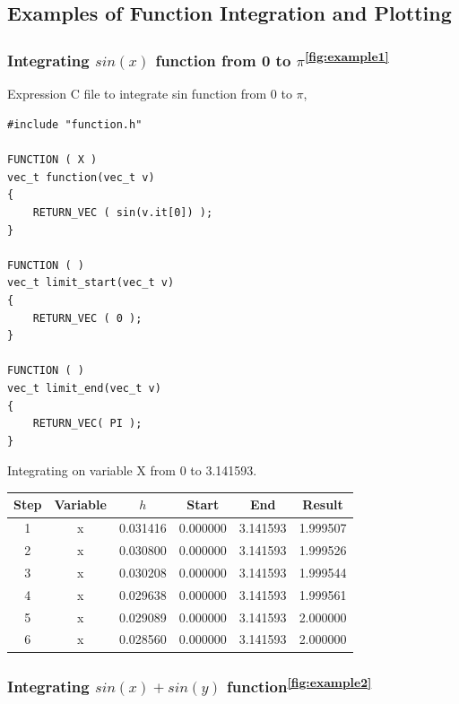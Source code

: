 \documentclass[12pt]{article}
\begin{document}
\pagebreak
\subsection{Examples of Function Integration and Plotting}

\subsubsection{Integrating $sin(x)$ function from 0 to $\pi$\textsuperscript{\ref{fig:example1}}}

\begin{flushleft}
Expression C file to integrate sin function from 0 to $\pi$,
\end{flushleft}

\begin{lstlisting}
#include "function.h"

FUNCTION ( X )
vec_t function(vec_t v)
{
	RETURN_VEC ( sin(v.it[0]) );
}

FUNCTION ( )
vec_t limit_start(vec_t v)
{
	RETURN_VEC ( 0 );
}

FUNCTION ( )
vec_t limit_end(vec_t v)
{
	RETURN_VEC( PI );
}
\end{lstlisting}

\begin{flushleft}
Integrating on variable X from 0 to 3.141593.
\end{flushleft}

\begin{center}
	\begin{tabular}{ |c c c c c c| }
		\hline
		\hline
		Step & Variable & $h$ & Start & End & Result \\
		\hline
		\hline
		1 & x & 0.031416 & 0.000000 & 3.141593 & 1.999507 \\
		\hline
		2 & x & 0.030800 & 0.000000 & 3.141593 & 1.999526 \\
		\hline
		3 & x & 0.030208 & 0.000000 & 3.141593 & 1.999544 \\
		\hline
		4 & x & 0.029638 & 0.000000 & 3.141593 & 1.999561 \\
		\hline
		5 & x & 0.029089 & 0.000000 & 3.141593 & 2.000000 \\
		\hline
		6 & x & 0.028560 & 0.000000 & 3.141593 & 2.000000 \\
		\hline
		\hline
	\end{tabular}
\end{center}

\subsubsection{Integrating $sin(x) + sin(y)$ function\textsuperscript{\ref{fig:example2}}}
\end{document}
